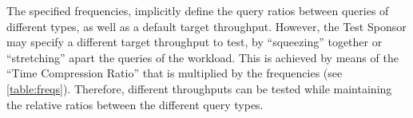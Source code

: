 The specified frequencies, implicitly define the query ratios between queries
of different types, as well as a default target throughput. However, the Test
Sponsor may specify a different target throughput to test,  by ``squeezing''
together or ``stretching'' apart the queries of the workload. This is
achieved by means of the ``Time Compression Ratio'' that is multiplied by the
frequencies (see \autoref{table:freqs}).  Therefore, different
throughputs can be tested while maintaining the relative ratios between the
different query types.
